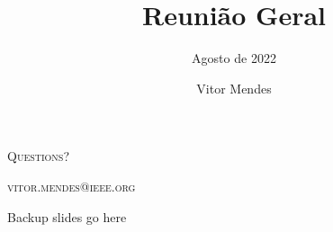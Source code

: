 \documentclass{cubeamer}
\title{Reunião Geral}
\subtitle{Agosto de 2022}
\author[Vitor Mendes]{Vitor Mendes}
\institute[SENAI CIMATEC]{SENAI CIMATEC - IEEE ROBOTICS AND AUTOMATION SOCIETY}
\begin{document}
\maketitle

\cutoc


% 
% 



\begin{frame}[standout]
    \Huge\textsc{Questions?}
    
    \vfill
    
    \LARGE\textsc{vitor.mendes@ieee.org}
\end{frame}

\appendix

\begin{frame}{Backup slides go here}
    
\end{frame}
\end{document}
